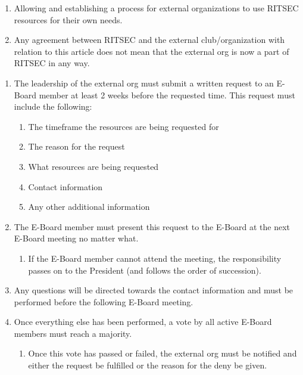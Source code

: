 


\begin{enumerate}
	\item Allowing and establishing a process for external organizations to use RITSEC resources for their own needs.
	\item Any agreement between RITSEC and the external club/organization with relation to this article does not mean that the external org is now a part of RITSEC in any way. 
\end{enumerate}



\begin{enumerate}
	\item The leadership of the external org must submit a written request to an E-Board member at least 2 weeks before the requested time. This request must include the following:
	\begin{enumerate}
		\item The timeframe the resources are being requested for
		\item The reason for the request
		\item What resources are being requested
		\item Contact information
		\item Any other additional information
	\end{enumerate}
	\item The E-Board member must present this request to the E-Board at the next E-Board meeting no matter what. 
	\begin{enumerate} 
		\item If the E-Board member cannot attend the meeting, the responsibility passes on to the President (and follows the order of succession). 
	\end{enumerate}
	\item Any questions will be directed towards the contact information and must be performed before the following E-Board meeting. 
	\item Once everything else has been performed, a vote by all active E-Board members must reach a majority. 
	\begin{enumerate}
		\item Once this vote has passed or failed, the external org must be notified and either the request be fulfilled or the reason for the deny be given.
	\end{enumerate}
\end{enumerate}